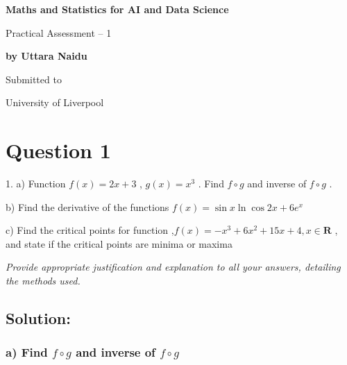 \documentclass[a4paper]{report}
\begin{document}
\pagestyle{fancy}

\begin{titlepage}
    \begin{center}
        \vspace*{1cm}
            
        \Huge
        \textbf{Maths and Statistics for AI and Data Science}
            
        \vspace{0.5cm}
        \LARGE
        Practical Assessment – 1
            
        \vspace{1.5cm}
            
        \textbf{by Uttara Naidu}
            
        \vfill
            
        Submitted to            

        University of Liverpool\\
            
    \end{center}
\end{titlepage}     



\section*{Question 1}

1. a) Function $f(x)=2x+3$ , $g(x)=x^3$ . Find $f{\circ}g$ and inverse of $f{\circ}g$ .  

b) Find the derivative of the functions  $f(x)=\sin x \ln \cos 2x+6{e^x}$ 

c) Find the critical points for function ,$f(x)=-x^3+6x^2+15x+4, x\in \mathbf{R}$  , and state if the critical points are minima or maxima 

\textit{Provide appropriate justification and explanation to all your answers, detailing the methods used.}

\subsection*{Solution:}

\subsubsection*{a) Find  $f{\circ}g$ and inverse of $f{\circ}g$}
\end{document}
